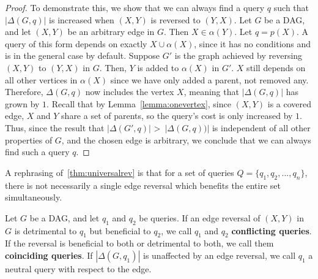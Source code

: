 \begin{proof}
To demonstrate this, we show that we can always find a query $q$ such that $|\Delta(G,q)|$ is increased when $(X,Y)$ is reversed to $(Y,X)$. Let $G$ be a DAG, and let $(X,Y)$ be an arbitrary edge in $G$. Then $X \in \alpha(Y)$. Let $q = p(X)$. A query of this form depends on exactly $X \cup \alpha(X)$, since it has no conditions and is in the general case by default. \newline
\null \quad \quad Suppose $G'$ is the graph achieved by reversing $(X,Y)$ to $(Y,X)$ in $G$. Then, $Y$ is added to $\alpha(X)$ in $G'$. $X$ still depends on all other vertices in $\alpha(X)$ since we have only added a parent, not removed any. Therefore, $\Delta(G,q)$ now includes the vertex $X$, meaning that $|\Delta(G,q)|$ has grown by $1$. Recall that by Lemma~\ref{lemma:onevertex}, since $(X,Y)$ is a covered edge, $X$ and $Y$ share a set of parents, so the query's cost is only increased by $1$. Thus, since the result that $|\Delta(G',q)|$ \textgreater \ $|\Delta(G,q))|$ is independent of all other properties of $G$, and the chosen edge is arbitrary, we conclude that we can always find such a query $q$. 
\end{proof}

\begin{remark}
A rephrasing of~\ref{thm:universalrev} is that for a set of queries $Q = \{q_{1}, q_{2}, ..., q_{n}\}$, there is not necessarily a single edge reversal which benefits the entire set simultaneously. 
\end{remark}

\begin{definition}
Let $G$ be a DAG, and let $q_{1}$ and $q_{2}$ be queries. If an edge reversal of $(X,Y)$ in $G$ is detrimental to $q_{1}$ but beneficial to $q_{2}$, we call $q_{1}$ and $q_{2}$ \textbf{conflicting queries}. If the reversal is beneficial to both or detrimental to both, we call them \textbf{coinciding queries}. If $|\Delta(G,q_{1})|$ is unaffected by an edge reversal, we call $q_{1}$ a neutral query with respect to the edge. 
\end{definition}

\begin{center}
\begin{figure}[h!]
\centering
{}
\caption{}
\label{fig:querydetriment}
\end{figure}
\end{center}

